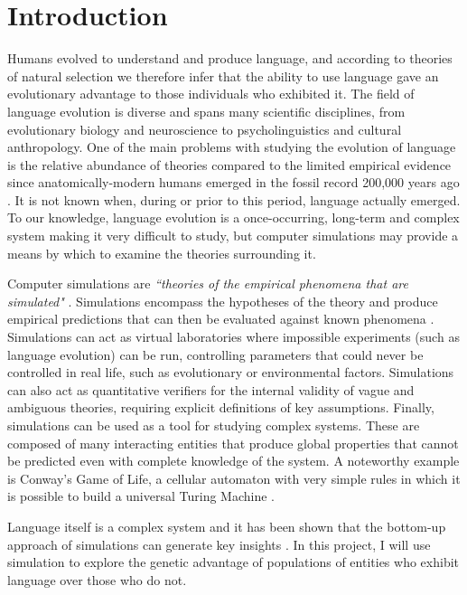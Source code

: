 \documentclass[12pt,a4paper]{report}
\begin{document}

\pagestyle{headings}

\chapter{Introduction}
\setcounter{page}{1}

Humans evolved to understand and produce language, and according to theories of natural selection we therefore infer that the ability to use language gave an evolutionary advantage to those individuals who exhibited it. The field of language evolution is diverse and spans many scientific disciplines, from evolutionary biology and neuroscience to psycholinguistics and cultural anthropology. One of the main problems with studying the evolution of language is the relative abundance of theories compared to the limited empirical evidence since anatomically-modern humans emerged in the fossil record 200,000 years ago \citep{Fleagle2008}. It is not known when, during or prior to this period, language actually emerged. To our knowledge, language evolution is a once-occurring, long-term and complex system making it very difficult to study, but computer simulations may provide a means by which to examine the theories surrounding it.

Computer simulations are \emph{``theories of the empirical phenomena that are simulated"} \citep{Cangelosi2002}. Simulations encompass the hypotheses of the theory and produce empirical predictions that can then be evaluated against known phenomena \citep{cavalli1997genes}. Simulations can act as virtual laboratories where impossible experiments (such as language evolution) can be run, controlling parameters that could never be controlled in real life, such as evolutionary or environmental factors. Simulations can also act as quantitative verifiers for the internal validity of vague and ambiguous theories, requiring explicit definitions of key assumptions. Finally, simulations can be used as a tool for studying complex systems. These are composed of many interacting entities that produce global properties that cannot be predicted even with complete knowledge of the system. A noteworthy example is Conway's Game of Life, a cellular automaton with very simple rules in which it is possible to build a universal Turing Machine \citep{rendell2002turing}.

Language itself is a complex system and it has been shown that the bottom-up approach of simulations can generate key insights \citep{langton1997artificial}. In this project, I will use simulation to explore the genetic advantage of populations of entities who exhibit language over those who do not.
\end{document}
